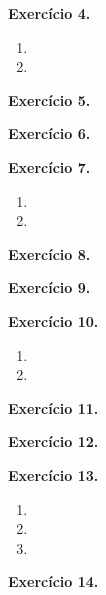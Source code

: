 \documentclass[12pt,a4paper]{article}
\begin{document}
\vspace{0.5cm}
\noindent\textbf{Exercício 4.}
\begin{enumerate}
    \renewcommand{\theenumi}{\alph{enumi}}
    \renewcommand{\labelenumi}{\theenumi)}
    \item 
    \item 
\end{enumerate}

\vspace{0.5cm}
\noindent\textbf{Exercício 5.}

\vspace{0.5cm}
\noindent\textbf{Exercício 6.}

\vspace{0.5cm}
\noindent\textbf{Exercício 7.}
\begin{enumerate}
    \renewcommand{\theenumi}{\alph{enumi}}
    \renewcommand{\labelenumi}{\theenumi)}
    \item 
    \item 
\end{enumerate}

\vspace{0.5cm}
\noindent\textbf{Exercício 8.}

\vspace{0.5cm}
\noindent\textbf{Exercício 9.}

\vspace{0.5cm}
\noindent\textbf{Exercício 10.}
\begin{enumerate}
    \renewcommand{\theenumi}{\alph{enumi}}
    \renewcommand{\labelenumi}{\theenumi)}
    \item 
    \item 
\end{enumerate}

\vspace{0.5cm}
\noindent\textbf{Exercício 11.}

\vspace{0.5cm}
\noindent\textbf{Exercício 12.}

\vspace{0.5cm}
\noindent\textbf{Exercício 13.}
\begin{enumerate}
    \renewcommand{\theenumi}{\alph{enumi}}
    \renewcommand{\labelenumi}{\theenumi)}
    \item 
    \item 
    \item 
\end{enumerate}

\vspace{0.5cm}
\noindent\textbf{Exercício 14.}
\end{document}
